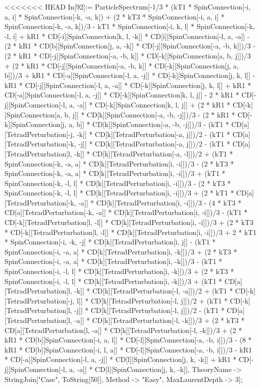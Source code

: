 <<<<<<< HEAD
In[92]:= ParticleSpectrum[-1/3 * (kT1 * SpinConnection[-i, a, i] * SpinConnection[-k, -a, k]) + (2 * kT3 * SpinConnection[-i, a, i] * SpinConnection[-k, -a, k])/3 - kT1 * SpinConnection[-i, k, l] * SpinConnection[-k, -l, i] + kR1 * CD[-i][SpinConnection[k, l, -k]] * CD[i][SpinConnection[-l, a, -a]] - (2 * kR1 * CD[b][SpinConnection[j, a, -k]] * CD[-j][SpinConnection[-a, -b, k]])/3 - (2 * kR1 * CD[-j][SpinConnection[-a, -b, k]] * CD[-k][SpinConnection[a, b, j]])/3 + (2 * kR1 * CD[-j][SpinConnection[-a, -b, k]] * CD[-k][SpinConnection[j, a, b]])/3 + kR1 * CD[-a][SpinConnection[-l, a, -j]] * CD[-k][SpinConnection[j, k, l]] - kR1 * CD[-j][SpinConnection[-l, a, -a]] * CD[-k][SpinConnection[j, k, l]] + kR1 * CD[-a][SpinConnection[-l, a, -j]] * CD[-k][SpinConnection[k, l, j]] - 2 * kR1 * CD[-j][SpinConnection[-l, a, -a]] * CD[-k][SpinConnection[k, l, j]] + (2 * kR1 * CD[-k][SpinConnection[a, b, j]] * CD[k][SpinConnection[-a, -b, -j]])/3 - (2 * kR1 * CD[-k][SpinConnection[j, a, b]] * CD[k][SpinConnection[-a, -b, -j]])/3 - (kT1 * CD[a][TetradPerturbation[-j, -k]] * CD[k][TetradPerturbation[-a, j]])/2 - (kT1 * CD[a][TetradPerturbation[-k, -j]] * CD[k][TetradPerturbation[-a, j]])/2 - (kT1 * CD[a][TetradPerturbation[l, -k]] * CD[k][TetradPerturbation[-a, -l]])/2 + (kT1 * SpinConnection[-k, -a, a] * CD[k][TetradPerturbation[i, -i]])/3 - (2 * kT3 * SpinConnection[-k, -a, a] * CD[k][TetradPerturbation[i, -i]])/3 + (kT1 * SpinConnection[-k, -l, l] * CD[k][TetradPerturbation[i, -i]])/3 - (2 * kT3 * SpinConnection[-k, -l, l] * CD[k][TetradPerturbation[i, -i]])/3 + (2 * kT1 * CD[a][TetradPerturbation[-k, -a]] * CD[k][TetradPerturbation[i, -i]])/3 - (4 * kT3 * CD[a][TetradPerturbation[-k, -a]] * CD[k][TetradPerturbation[i, -i]])/3 - (kT1 * CD[-k][TetradPerturbation[l, -l]] * CD[k][TetradPerturbation[i, -i]])/3 + (2 * kT3 * CD[-k][TetradPerturbation[l, -l]] * CD[k][TetradPerturbation[i, -i]])/3 + 2 * kT1 * SpinConnection[-i, -k, -j] * CD[k][TetradPerturbation[i, j]] - (kT1 * SpinConnection[-i, -a, a] * CD[k][TetradPerturbation[i, -k]])/3 + (2 * kT3 * SpinConnection[-i, -a, a] * CD[k][TetradPerturbation[i, -k]])/3 - (kT1 * SpinConnection[-i, -l, l] * CD[k][TetradPerturbation[i, -k]])/3 + (2 * kT3 * SpinConnection[-i, -l, l] * CD[k][TetradPerturbation[i, -k]])/3 + (kT1 * CD[a][TetradPerturbation[l, -k]] * CD[k][TetradPerturbation[-l, -a]])/2 + (kT1 * CD[-k][TetradPerturbation[-j, l]] * CD[k][TetradPerturbation[-l, j]])/2 + (kT1 * CD[-k][TetradPerturbation[l, -j]] * CD[k][TetradPerturbation[-l, j]])/2 - (kT1 * CD[a][TetradPerturbation[l, -a]] * CD[k][TetradPerturbation[-l, -k]])/3 + (2 * kT3 * CD[a][TetradPerturbation[l, -a]] * CD[k][TetradPerturbation[-l, -k]])/3 + (2 * kR1 * CD[b][SpinConnection[-i, a, l]] * CD[-l][SpinConnection[-a, -b, i]])/3 - (8 * kR1 * CD[b][SpinConnection[-i, l, a]] * CD[-l][SpinConnection[-a, -b, i]])/3 - kR1 * CD[-a][SpinConnection[-l, a, -j]] * CD[l][SpinConnection[j, k, -k]] + kR1 * CD[-j][SpinConnection[-l, a, -a]] * CD[l][SpinConnection[j, k, -k]], TheoryName -> StringJoin["Case", ToString[50]], Method -> "Easy", MaxLaurentDepth -> 3]; 
